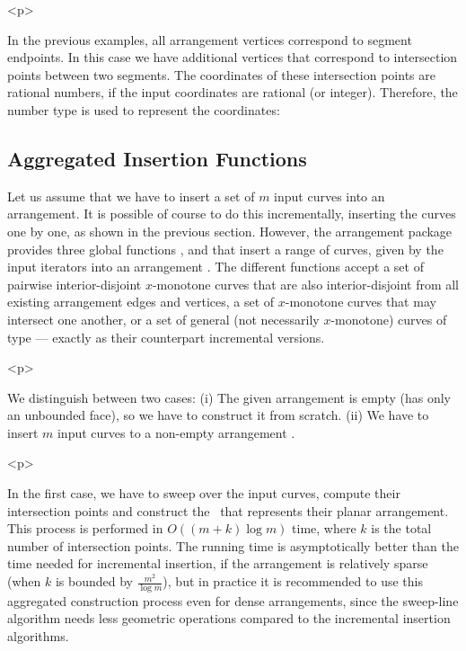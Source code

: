 \begin{ccHtmlOnly}<p>\end{ccHtmlOnly}
In the previous examples, all arrangement vertices correspond to
segment endpoints. In this case we have additional vertices that
correspond to intersection points between two segments. The
coordinates of these intersection points are rational numbers, if
the input coordinates are rational (or integer). Therefore,
the  number type is used to represent the
coordinates:


\subsection{Aggregated Insertion Functions}
\label{arr_ssec:agg_insert}
%
Let us assume that we have to insert a set of $m$ input curves into an
arrangement. It is possible of course to do this incrementally, 
inserting the curves one by one, as shown in the previous section.
However, the arrangement package provides three global functions
,
 and
 that insert a range of curves,
given by the input iterators \ccc{[begin, end)} into an arrangement
. The different functions accept a set of pairwise
interior-disjoint $x$-monotone curves that are also interior-disjoint
from all existing arrangement edges and vertices, a set of $x$-monotone
curves that may intersect one another, or a set of general (not
necessarily $x$-monotone) curves of type  --- exactly as their
counterpart incremental versions.

\begin{ccHtmlOnly}<p>\end{ccHtmlOnly}
We distinguish between two cases: (i) The given arrangement
 is empty (has only an unbounded face), so we have to
construct it from scratch. (ii) We have to insert $m$ input curves
to a non-empty arrangement .

\begin{ccHtmlOnly}<p>\end{ccHtmlOnly}
In the first case, we have to sweep over the input curves, compute
their intersection points and construct the \dcel\ that represents
their planar arrangement. This process is performed in
$O\left((m + k)\log m\right)$ time, where $k$ is the total number
of intersection points. The running time is asymptotically better
than the time needed for incremental insertion, if the arrangement
is relatively sparse (when $k$ is bounded by $\frac{m^2}{\log
m}$), but in practice it is recommended to use this aggregated
construction process even for dense arrangements, since the
sweep-line algorithm needs less geometric operations compared to
the incremental insertion algorithms.

